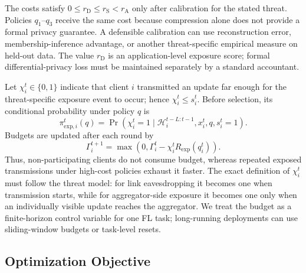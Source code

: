 \documentclass[preprint,12pt]{elsarticle}
\begin{document}
The costs satisfy $0\leq r_{\mathrm{D}}\leq r_{\mathrm{S}}<r_{\mathrm{A}}$ only after calibration for the stated threat. Policies $q_1$--$q_3$ receive the same cost because compression alone does not provide a formal privacy guarantee. A defensible calibration can use reconstruction error, membership-inference advantage, or another threat-specific empirical measure on held-out data. The value $r_{\mathrm{D}}$ is an application-level exposure score; formal differential-privacy loss must be maintained separately by a standard accountant.


Let $\chi_i^t\in\{0,1\}$ indicate that client $i$ transmitted an update far enough for the threat-specific exposure event to occur; hence $\chi_i^t\leq s_i^t$. Before selection, its conditional probability under policy $q$ is
\begin{equation}
	\pi_{\mathrm{exp},i}^t(q)=
	\Pr\!\left(\chi_i^t=1\mid \mathcal H_i^{t-L:t-1},x_i^t,q,s_i^t=1\right).
	\label{eq:exposure_probability}
\end{equation}
Budgets are updated after each round by
\begin{equation}
	\Gamma_i^{t+1}
	=
	\max\left(0,\Gamma_i^t - \chi_i^t R_{\mathrm{exp}}(q_i^t)\right).
	\label{eq:budget_update}
\end{equation}
Thus, non-participating clients do not consume budget, whereas repeated exposed transmissions under high-cost policies exhaust it faster. The exact definition of $\chi_i^t$ must follow the threat model: for link eavesdropping it becomes one when transmission starts, while for aggregator-side exposure it becomes one only when an individually visible update reaches the aggregator. We treat the budget as a finite-horizon control variable for one FL task; long-running deployments can use sliding-window budgets or task-level resets.

\subsection{Optimization Objective}
\end{document}
